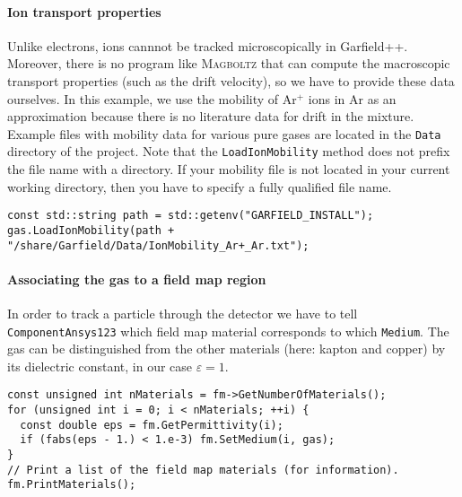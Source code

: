 \paragraph{Ion transport properties}
Unlike electrons, ions cannnot be tracked microscopically in Garfield++.
Moreover, there is no program like \textsc{Magboltz} that can compute  
the macroscopic transport properties (such as the drift velocity),
so we have to provide these data ourselves.
In this example, we use the mobility of Ar$^{+}$ ions in Ar
as an approximation because there is no literature data for drift in the
mixture.
Example files with mobility data for various pure gases are located
in the \texttt{Data} directory of the project.
Note that the \texttt{LoadIonMobility} method does not prefix
the file name with a directory.
If your mobility file is not located in your current working directory,
then you have to specify a fully qualified file name.
\begin{lstlisting}
const std::string path = std::getenv("GARFIELD_INSTALL");
gas.LoadIonMobility(path + "/share/Garfield/Data/IonMobility_Ar+_Ar.txt");
\end{lstlisting}
\paragraph{Associating the gas to a field map region}
In order to track a particle through the detector we have to 
tell \texttt{ComponentAnsys123} which field map material corresponds 
to which \texttt{Medium}.
The gas can be distinguished from the other materials
(here: kapton and copper) by its dielectric constant, in our case
$\varepsilon = 1$.
\begin{lstlisting}
const unsigned int nMaterials = fm->GetNumberOfMaterials();
for (unsigned int i = 0; i < nMaterials; ++i) {
  const double eps = fm.GetPermittivity(i);
  if (fabs(eps - 1.) < 1.e-3) fm.SetMedium(i, gas);
}
// Print a list of the field map materials (for information).
fm.PrintMaterials();
\end{lstlisting}

